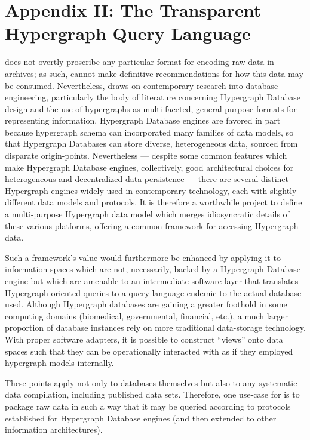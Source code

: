 \documentclass[11pt,letterpaper]{article}
\newcommand{\ATexttclr}[1]{\textcolor{tcolor}{\textbf{#1}}}
\newcommand{\lSDRF}{\resizebox{!}{8pt}{\ATexttclr{S}}\resizebox{!}{8pt}{\ATexttclr{DR%
\hspace{1pt}{\raisebox{-.5pt}{\fontfamily{qhv}\fontseries{b}\selectfont{}\Large{F}}%
}}}}
\newcommand{\SDRF}{\resizebox{!}{8pt}{\ATexttclr{S}}\resizebox{!}{8pt}{\ATexttclr{DR%
\hspace{1pt}{\raisebox{-1pt}{\fontfamily{qhv}\fontseries{b}\selectfont{}\Large{F}}%
}}}}
\newcommand{\p}[1]{

\vspace{.7em}#1}
\newcommand{\q}[1]{{\fontfamily{qcr}\selectfont ``}#1{\fontfamily{qcr}\selectfont ''}}
\begin{document}
{\section{Appendix II: The Transparent Hypergraph Query Language}
\p{\lSDRF{} does not overtly proscribe any particular 
format for encoding raw data in \SDRF{} archives; 
as such, \SDRF{} cannot make definitive recommendations 
for how this data may be consumed.  Nevertheless, 
\SDRF{} draws on contemporary research into database 
engineering, particularly the body of literature 
concerning Hypergraph Database design and the 
use of hypergraphs as multi-faceted, general-purpose 
formats for representing information.  Hypergraph 
Database engines are favored in part because hypergraph 
schema can incorporated many families of data models, 
so that Hypergraph Databases can store diverse, heterogeneous 
data, sourced from disparate origin-points.  
Nevertheless --- despite some common features which make Hypergraph Database 
engines, collectively, good architectural choices 
for heterogeneous and decentralized data persistence ---  
there are several distinct Hypergraph engines 
widely used in contemporary technology, each with slightly 
different data models and protocols.  It is therefore a 
worthwhile project to define a multi-purpose Hypergraph data 
model which merges idiosyncratic details of 
these various platforms, offering a common framework for 
accessing Hypergraph data.}

\p{Such a framework's value would 
furthermore be enhanced by applying it to information spaces which 
are not, necessarily, backed by a Hypergraph Database engine 
but which are amenable to an intermediate software layer that 
translates Hypergraph-oriented queries to a query language 
endemic to the actual database used.  Although Hypergraph databases 
are gaining a greater foothold in some computing domains 
(biomedical, governmental, financial, etc.), a much larger 
proportion of database instances rely on more traditional 
data-storage technology.   With proper software 
adapters, it is possible to construct \q{views} onto 
data spaces such that they can be operationally interacted 
with as if they employed hypergraph models internally.}

\p{These points apply not only to databases themselves 
but also to any systematic data compilation, including 
published data sets.  Therefore, one use-case for 
\SDRF{} is to package raw data in such a way that 
it may be queried according to protocols established 
for Hypergraph Database engines (and then extended 
to other information architectures).}

}
\end{document}
